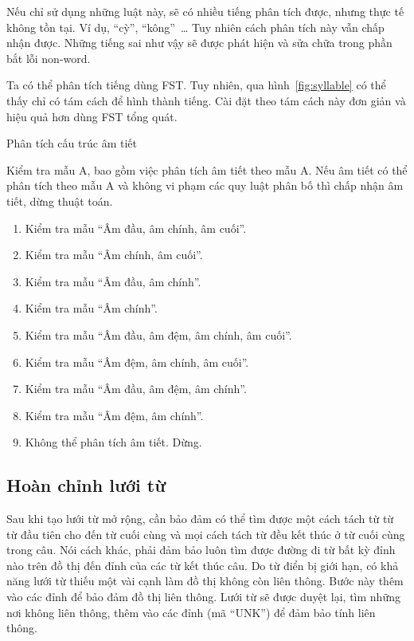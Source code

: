 \documentclass[a4paper,oneside,14pt]{extbook} %
\begin{document}
Nếu chỉ sử dụng những luật này, sẽ có nhiều tiếng phân tích được,
nhưng thực tế không tồn tại. Ví dụ, ``cỳ'', ``kông''~\ldots{} Tuy
nhiên cách phân tích này vẫn chấp nhận được. Những tiếng sai như vậy
sẽ được phát hiện và sửa chữa trong phần bắt lỗi non-word.

Ta có thể phân tích tiếng dùng FST. Tuy nhiên, qua
 hình~\ref{fig:syllable} có thể thấy chỉ có tám cách để hình thành
tiếng. Cài đặt theo tám cách này đơn giản và hiệu quả hơn dùng FST
tổng quát. 
\begin{algo}\caption{Phân tích cấu trúc âm tiết}
  Kiểm tra mẫu A, bao gồm việc phân tích âm tiết theo mẫu A. Nếu âm
  tiết có thể phân tích theo mẫu A và không vi phạm các quy luật phân
  bố thì chấp nhận âm tiết, dừng thuật toán.
  \begin{enumerate}
  \item Kiểm tra mẫu ``Âm đầu, âm chính, âm cuối''.
  \item Kiểm tra mẫu ``Âm chính, âm cuối''. 
  \item Kiểm tra mẫu ``Âm đầu, âm chính''. 
  \item Kiểm tra mẫu ``Âm chính''. 
  \item Kiểm tra mẫu ``Âm đầu, âm đệm, âm chính, âm cuối''. 
  \item Kiểm tra mẫu ``Âm đệm, âm chính, âm cuối''. 
  \item Kiểm tra mẫu ``Âm đầu, âm đệm, âm chính''. 
  \item Kiểm tra mẫu ``Âm đệm, âm chính''. 
  \item Không thể phân tích âm tiết. Dừng.
  \end{enumerate}
\end{algo}

\subsection{Hoàn chỉnh lưới từ}
\label{sec:lattice:competion}

Sau khi tạo lưới từ mở rộng, cần bảo đảm có thể tìm được một cách tách
từ từ từ đầu tiên cho đến từ cuối cùng và mọi cách tách từ đều kết thúc
ở từ cuối cùng trong câu. Nói cách khác, phải đảm bảo luôn tìm được
đường đi từ bất kỳ đỉnh nào trên đồ thị đến đỉnh của các từ kết thúc câu.
Do từ điển bị giới hạn, có khả năng lưới từ thiếu một vài cạnh làm đồ
thị không còn liên thông. Bước này thêm vào các đỉnh để bảo đảm đồ thị
liên thông. Lưới từ sẽ được duyệt lại, tìm những nơi không liên thông,
thêm vào các đỉnh (mã ``UNK'') để đảm bảo tính liên thông. 
\end{document}
